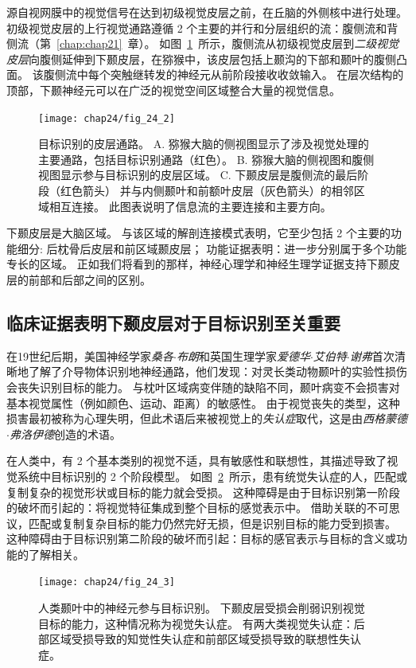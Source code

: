 源自视网膜中的视觉信号在达到初级视觉皮层之前，在丘脑的外侧核中进行处理。
初级视觉皮层的上行视觉通路遵循 2 个主要的并行和分层组织的流：腹侧流和背侧流（第~\ref{chap:chap21}~章）。
如图~\ref{fig:24_2}~所示，腹侧流从初级视觉皮层到\textit{二级视觉皮层}向腹侧延伸到下颞皮层，在猕猴中，该皮层包括上颞沟的下部和颞叶的腹侧凸面。
该腹侧流中每个突触继转发的神经元从前阶段接收收敛输入。
在层次结构的顶部，下颞神经元可以在广泛的视觉空间区域整合大量的视觉信息。


\begin{figure}[htbp]
	\centering
	\texttt{[image: chap24/fig\_24\_2]}
	\caption{目标识别的皮层通路。
		A. 猕猴大脑的侧视图显示了涉及视觉处理的主要通路，包括目标识别通路（红色）。
		B. 猕猴大脑的侧视图和腹侧视图显示参与目标识别的皮层区域。
		C. 下颞皮层是腹侧流的最后阶段（红色箭头） 并与内侧颞叶和前额叶皮层（灰色箭头）的相邻区域相互连接。
		此图表说明了信息流的主要连接和主要方向。}
	\label{fig:24_2}
\end{figure}


下颞皮层是大脑区域。
与该区域的解剖连接模式表明，它至少包括 2 个主要的功能细分: 后枕骨后皮层和前区域颞皮层；
功能证据表明：进一步分别属于多个功能专长的区域。
正如我们将看到的那样，神经心理学和神经生理学证据支持下颞皮层的前部和后部之间的区别。



\subsection{临床证据表明下颞皮层对于目标识别至关重要}

在19世纪后期，美国神经学家\textit{桑各$\cdot$布朗}和英国生理学家\textit{爱德华$\cdot$艾伯特$\cdot$谢弗}首次清晰地了解了介导物体识别地神经通路，他们发现：对灵长类动物颞叶的实验性损伤会丧失识别目标的能力。
与枕叶区域病变伴随的缺陷不同，颞叶病变不会损害对基本视觉属性（例如颜色、运动、距离）的敏感性。
由于视觉丧失的类型，这种损害最初被称为心理失明，但此术语后来被视觉上的\textit{失认症}取代，这是由\textit{西格蒙德$\cdot$弗洛伊德}创造的术语。


在人类中，有 2 个基本类别的视觉不适，具有敏感性和联想性，其描述导致了视觉系统中目标识别的 2 个阶段模型。
如图~\ref{fig:24_3}~所示，患有统觉失认症的人，匹配或复制复杂的视觉形状或目标的能力就会受损。
这种障碍是由于目标识别第一阶段的破坏而引起的：将视觉特征集成到整个目标的感觉表示中。
借助关联的不可思议，匹配或复制复杂目标的能力仍然完好无损，但是识别目标的能力受到损害。
这种障碍由于目标识别第二阶段的破坏而引起：目标的感官表示与目标的含义或功能的了解相关。


\begin{figure}[htbp]
	\centering
	\texttt{[image: chap24/fig\_24\_3]}
	\caption{人类颞叶中的神经元参与目标识别。
		下颞皮层受损会削弱识别视觉目标的能力，这种情况称为视觉失认症。
		有两大类视觉失认症：后部区域受损导致的知觉性失认症和前部区域受损导致的联想性失认症。}
	\label{fig:24_3}
\end{figure}


